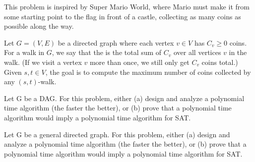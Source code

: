 \documentclass{article}
\begin{document}
\setcounter{section}{12}
\setcounter{exercise}{15}
 
This problem is inspired by Super Mario World, where Mario must make it from some starting point to the flag in front of a castle, collecting as many coins as possible along the way.

Let $G = (V,E)$ be a directed graph where each vertex $v \in V$ has $C_v \geq 0$ coins.
For a walk in $G$, we say that the  is the total sum of $C_v$ over all  vertices $v$ in the walk.
(If we visit a vertex $v$ more than once, we still only get $C_v$ coins total.)
Given $s, t \in V$, the goal is to compute the maximum number of coins collected by any $(s, t)$-walk.
\begin{subexercise}
Let G be a DAG.
For this problem, either (a) design and analyze a polynomial time algorithm (the faster the better), or (b) prove that a polynomial time algorithm would imply a polynomial time algorithm for SAT.
\end{subexercise}

\begin{solution}

\end{solution}
\pagebreak

\begin{subexercise}
Let G be a general directed graph.
For this problem, either (a) design and analyze a polynomial time algorithm (the faster the better), or (b) prove that a polynomial time algorithm would imply a polynomial time algorithm for SAT.
\end{subexercise}

\begin{solution}

\end{solution}
\pagebreak
\end{document}
